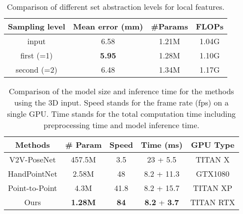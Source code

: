 \documentclass[10pt,twocolumn,letterpaper]{article}
\begin{document}
\begin{table}[h!]
\small
\begin{center}

\begin{tabular}{c|ccc}
\hline

Sampling level &  Mean error (mm) & \#Params & FLOPs \\ 
\hline


input &  6.58 & 1.21M & 1.04G\\
first (=1) &  \textbf{5.95} & 1.28M & 1.10G\\
second (=2) &  6.48 & 1.34M & 1.17G\\
\hline

\end{tabular}
\end{center}
\caption{Comparison of different set abstraction levels for local features. 
}
\label{tab:level}
\end{table}

\begin{table}[h!]
\small
\setlength\tabcolsep{3pt}\begin{center}

\begin{tabular}{c|cccc}
\hline
Methods         & \# Param & Speed &Time (ms) & GPU Type\\
\hline
V2V-PoseNet \cite{moon2018v2v}     & 457.5M    & 3.5 & 23 + 5.5 & TITAN X\\
HandPointNet \cite{ge2018hand}    & 2.58M     & 48 & 8.2 + 11.3 & GTX1080\\
Point-to-Point \cite{ge2018point}  & 4.3M      & 41.8 & 8.2 + 15.7 & TITAN XP\\
Ours            & \textbf{1.28M}     & \textbf{84}   & \textbf{8.2} + \textbf{3.7} & TITAN RTX\\ 
\hline

\end{tabular}
\end{center}
\caption{Comparison of the model size and inference time for the methods using the 3D input. Speed stands for the frame rate (fps) on a single GPU. Time stands for the total computation time including preprocessing time and model inference time.}
\label{tab:speed}
\end{table}
\end{document}
